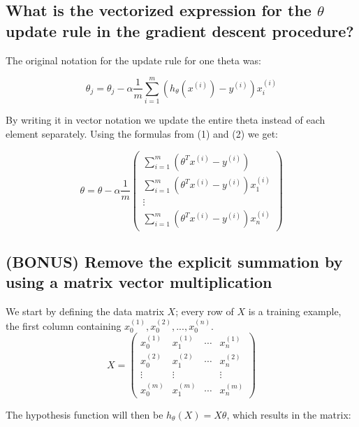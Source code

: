 \documentclass{article}
\begin{document}
\subsection{What is the vectorized expression for the $\theta$ update rule in the gradient descent procedure?}
The original notation for the update rule for one theta was:

\begin{equation*}
\theta_j = \theta_j - \alpha \frac{1}{m}  \sum\limits_{i=1}^m (h _{\theta} (x ^{(i)}) - y ^{(i)})x_i^{(i)}
\end{equation*}

By writing it in vector notation we update the entire theta instead of each element separately. Using the formulas from (1) and (2) we get:

\begin{equation*}
\theta = \theta - \alpha \frac{1}{m}\begin{pmatrix}	\sum\limits_{i=1}^m ( \theta^T x^{(i)}  - y ^{(i)})\\ 
									     		\sum\limits_{i=1}^m ( \theta^T x^{(i)}  - y ^{(i)})x_1^{(i)} \\ 
										      	 \vdots \\
										 	\sum\limits_{i=1}^m ( \theta^T x^{(i)}  - y ^{(i)})x_n^{(i)}
						\end{pmatrix}
\end{equation*}

\subsection{(BONUS) Remove the explicit summation by using a matrix vector multiplication}
We start by defining the data matrix $X$; every row of $X$ is a training example, the first column containing $x_0^{(1)}, x_0^{(2)}, ..., x_0^{(n)}$.\\

\begin{equation*}
X = \begin{pmatrix} 
	x_0^{(1)} & x_1^{(1)} & \cdots & x_n^{(1)} \\
	x_0^{(2)} & x_1^{(2)} & \cdots & x_n^{(2)} \\
	\vdots & \vdots & & \vdots \\
	x_0^{(m)} & x_1^{(m)} & \cdots & x_n^{(m)}
     \end{pmatrix}
\end{equation*}

The hypothesis function will then be $h_\theta(X) = X \theta$, which results in the matrix:
\end{document}
